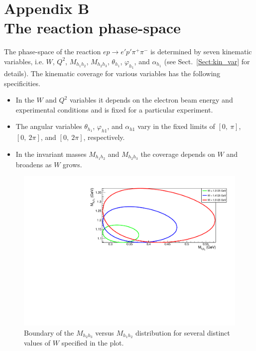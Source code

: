 
\renewcommand{\thechapter}{B}
    \makeatletter
   \renewcommand{\theequation}{\thechapter.\@arabic\c@equation}
    \makeatother
\chapter*{Appendix B \\\tiny\vspace{-0.4\baselineskip} \LARGE The reaction phase-space}
\label{app_ph_space}



The phase-space of the reaction $ep \rightarrow e'p'\pi^{+}\pi^{-}$ is determined by seven kinematic variables, i.e. $W$, $Q^{2}$, $M_{h_{1}h_{2}}$, $M_{h_{2}h_{3}}$, $\theta_{h_{1}}$, $\varphi_{h_{1}}$, and $\alpha_{h_{1}}$ (see Sect.~\ref{Sect:kin_var} for details). The kinematic coverage for various variables has the following specificities.\vspace{-0.2em} 
\begin{itemize}
\item In the $W$ and $Q^{2}$ variables it depends on the electron beam energy and experimental conditions and is fixed for a particular experiment. \vspace{-0.3em}
\item The angular variables $\theta_{h_{1}}$, $\varphi_{h1}$, and $\alpha_{h1}$ vary in the fixed limits of $[0,~\pi]$, $[0,~2\pi]$, and $[0,~2\pi]$, respectively.\vspace{-0.3em}
\item In the invariant masses $M_{h_{1}h_{2}}$ and $M_{h_{2}h_{3}}$ the coverage depends on $W$ and broadens as $W$ grows.\vspace{-0.2em}
\end{itemize}
\vspace{-1em}
\begin{figure}[htp]
\begin{center}
\includegraphics[width=13cm]{pictures/appendix/dalitz_plots_boundaries.pdf}
\caption{\small Boundary of the $M_{h_{2}h_{3}}$ versus $M_{h_{1}h_{2}}$ distribution for several distinct values of $W$ specified in the plot.} \label{fig:dalitz}
\end{center}
\end{figure}


